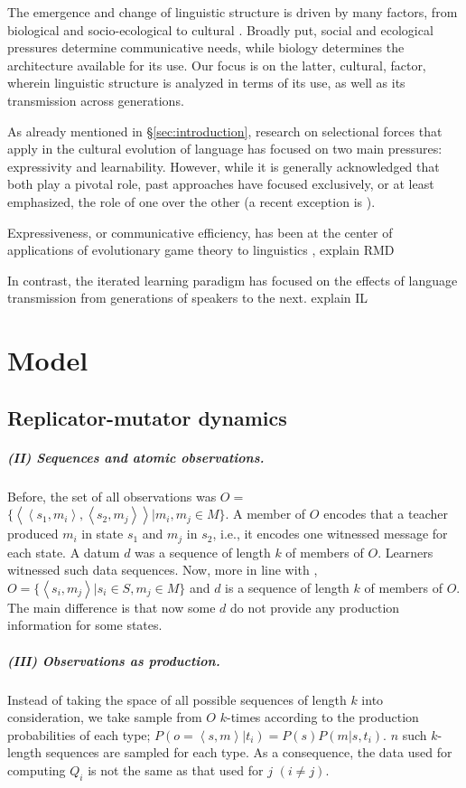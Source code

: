\documentclass[a4paper]{article}
\newcommand{\tuple}[1]{\ensuremath{\left\langle #1 \right\rangle}}
\newcommand{\hl}[1]{\textcolor[rgb]{.8,.33,.0}{#1}}%
\begin{document}
The emergence and change of linguistic structure is driven by many factors, from biological and socio-ecological to cultural \citep{steels:2011,tamariz+kirby:2016}. Broadly put, social and ecological pressures determine communicative needs, while biology determines the architecture available for its use. Our focus is on the latter, cultural, factor, wherein linguistic structure is analyzed in terms of its use, as well as its transmission across generations. 

As already mentioned in \S\ref{sec:introduction}, research on selectional forces that apply in the cultural evolution of language has focused on two main pressures: expressivity and learnability. However, while it is generally acknowledged that both play a pivotal role, past approaches have focused exclusively, or at least emphasized, the role of one over the other (a recent exception is \citealt{kirby+etal:2015}). 

Expressiveness, or communicative efficiency, has been at the center of applications of evolutionary game theory to linguistics \citep{nowak+krakauer:1999,huttegger+zollman:2013},  \hl{explain RMD}


In contrast, the iterated learning paradigm has focused on the effects of language transmission from generations of speakers to the next. \hl{explain IL}


\section{Model}
\subsection{Replicator-mutator dynamics}
\subparagraph{(II) Sequences and atomic observations.} Before, the set of all observations was $O =$\linebreak  $\{\tuple{\tuple{s_1,m_i},\tuple{s_2,m_j}} | m_i, m_j \in M\}$. A member of $O$ encodes that a teacher produced $m_i$ in state $s_1$ and $m_j$ in $s_2$, i.e., it encodes one witnessed message for each state. A datum $d$ was a sequence of length $k$ of members of $O$. Learners witnessed such data sequences. Now, more in line with \citet{griffiths+kalish:2007}, $O = \{\tuple{s_i,m_j} | s_i \in S, m_j \in M\}$ and $d$ is a sequence of length $k$ of members of $O$. The main difference is that now some $d$ do not provide any production information for some states.

\subparagraph{(III) Observations as production.} Instead of taking the space of all possible sequences of length $k$ into consideration, we take sample from $O$ $k$-times according to the production probabilities of each type; $P(o = \tuple{s,m} | t_i) = P(s) P(m|s,t_i)$. $n$ such $k$-length sequences are sampled for each type. As a consequence, the data used for computing $Q_i$ is not the same as that used for $j$ $(i \neq j)$.
\end{document}
